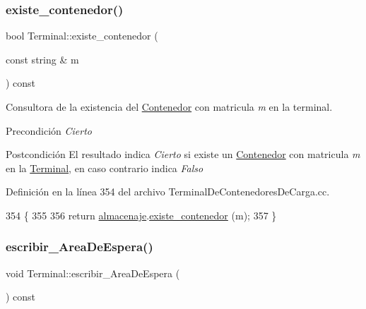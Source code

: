 \subsubsection{\texorpdfstring{existe\+\_\+contenedor()}{existe\_contenedor()}}
{\footnotesize\ttfamily bool Terminal\+::existe\+\_\+contenedor (\begin{DoxyParamCaption}\item[{const string \&}]{m }\end{DoxyParamCaption}) const}



Consultora de la existencia del \hyperlink{class_contenedor}{Contenedor} con matricula {\itshape m} en la terminal. 

\begin{DoxyPrecond}{Precondición}
{\itshape Cierto} 
\end{DoxyPrecond}
\begin{DoxyPostcond}{Postcondición}
El resultado indica {\itshape Cierto} si existe un \hyperlink{class_contenedor}{Contenedor} con matricula {\itshape m} en la \hyperlink{class_terminal}{Terminal}, en caso contrario indica {\itshape Falso} 
\end{DoxyPostcond}


Definición en la línea 354 del archivo Terminal\+De\+Contenedores\+De\+Carga.\+cc.


\begin{DoxyCode}
354                                                        \{
355     
356     \textcolor{keywordflow}{return} \hyperlink{class_terminal_a1d87d7b16c4f460eee6f1ab73da90fd2}{almacenaje}.\hyperlink{class_almacenaje_aa846d1cf215bd139527d2607d4cee833}{existe\_contenedor} (m);
357 \}
\end{DoxyCode}
\mbox{\label{class_terminal_a3da2635443b21d89e5fecc47153a888f}} 
\subsubsection{\texorpdfstring{escribir\+\_\+\+Area\+De\+Espera()}{escribir\_AreaDeEspera()}}
{\footnotesize\ttfamily void Terminal\+::escribir\+\_\+\+Area\+De\+Espera (\begin{DoxyParamCaption}{ }\end{DoxyParamCaption}) const}



